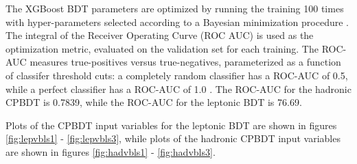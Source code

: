 The XGBoost BDT parameters are optimized by running the training 100 times with hyper-parameters selected according to a Bayesian minimization procedure \cite{skopt}. The integral of the Receiver Operating Curve (ROC AUC) is used as the optimization metric, evaluated on the validation set for each training. The ROC-AUC measures true-positives versus true-negatives, parameterized as a function of classifer threshold cuts: a completely random classifier has a ROC-AUC of 0.5, while a perfect classifier has a ROC-AUC of 1.0 \cite{ROC}. The ROC-AUC for the hadronic CPBDT is 0.7839, while the ROC-AUC for the leptonic BDT is 76.69.

Plots of the CPBDT input variables for the leptonic BDT are shown in figures \ref{fig:lepvbls1} -  \ref{fig:lepvbls3}, while plots of the hadronic CPBDT input variables are shown in figures \ref{fig:hadvbls1} -  \ref{fig:hadvbls3}.

